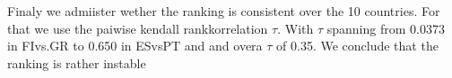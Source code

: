 Finaly we admiister wether the ranking is consistent over the 10 countries. For that we use the paiwise kendall rankkorrelation $\tau$. With $\tau$ spanning from 0.0373 in FIvs.GR to 0.650 in ESvsPT and and overa $\tau$ of 0.35. We conclude that the ranking is rather instable 
%
%
%
